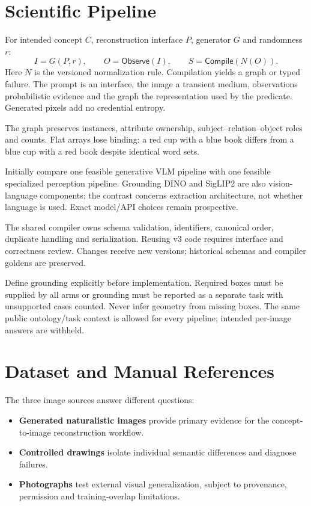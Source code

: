 \documentclass[11pt,a4paper]{article}
\begin{document}
\section{Scientific Pipeline}
For intended concept $C$, reconstruction interface $P$, generator $G$ and randomness $r$:
\[
 I=G(P,r),\qquad O=\mathsf{Observe}(I),\qquad
 S=\mathsf{Compile}(N(O)).
\]
Here $N$ is the versioned normalization rule. Compilation yields a graph or typed failure. The prompt is an interface, the image a transient medium, observations probabilistic evidence and the graph the representation used by the predicate. Generated pixels add no credential entropy.

The graph preserves instances, attribute ownership, subject--relation--object roles and counts. Flat arrays lose binding: a red cup with a blue book differs from a blue cup with a red book despite identical word sets.

Initially compare one feasible generative VLM pipeline with one feasible specialized perception pipeline. Grounding DINO and SigLIP2 are also vision-language components; the contrast concerns extraction architecture, not whether language is used. Exact model/API choices remain prospective.

The shared compiler owns schema validation, identifiers, canonical order, duplicate handling and serialization. Reusing v3 code requires interface and correctness review. Changes receive new versions; historical schemas and compiler goldens are preserved.

Define grounding explicitly before implementation. Required boxes must be supplied by all arms or grounding must be reported as a separate task with unsupported cases counted. Never infer geometry from missing boxes. The same public ontology/task context is allowed for every pipeline; intended per-image answers are withheld.

\section{Dataset and Manual References}
The three image sources answer different questions:
\begin{itemize}
\item \textbf{Generated naturalistic images} provide primary evidence for the concept-to-image reconstruction workflow.
\item \textbf{Controlled drawings} isolate individual semantic differences and diagnose failures.
\item \textbf{Photographs} test external visual generalization, subject to provenance, permission and training-overlap limitations.
\end{itemize}
\end{document}
